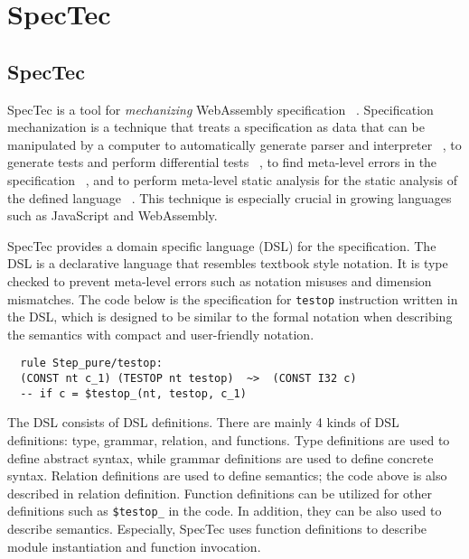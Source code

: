 
\chapter{SpecTec}
\label{ch:spectec}
\noindent



\newcommand{\seq}[1]{#1^*}







\section{SpecTec}
\label{sec:spectec}


SpecTec is a tool for \textit{mechanizing} WebAssembly specification
~\cite{spectec}.
Specification mechanization is a technique that treats a specification as data
that can be manipulated by a computer to automatically generate parser and
interpreter ~\cite{jiset}, to generate tests and perform differential tests
~\cite{jest}, to find meta-level errors in the specification ~\cite{jstar}, and
to perform meta-level static analysis for the static analysis of the defined
language ~\cite{jsaver}.
This technique is especially crucial in growing languages such as JavaScript
and WebAssembly.


SpecTec provides a domain specific language (DSL) for the specification.
The DSL is a declarative language that resembles textbook style notation.
It is type checked to prevent meta-level errors such as notation misuses and
dimension mismatches. The code below is the specification for \texttt{testop}
instruction written in the DSL, which is designed to be similar to the formal
notation when describing the semantics with compact and user-friendly
notation.
\\
\begin{verbatim}
  rule Step_pure/testop:
  (CONST nt c_1) (TESTOP nt testop)  ~>  (CONST I32 c)
  -- if c = $testop_(nt, testop, c_1)
\end{verbatim}


The DSL consists of DSL definitions.
There are mainly 4 kinds of DSL definitions: type, grammar, relation, and
functions.
Type definitions are used to define abstract syntax, while grammar definitions
are used to define concrete syntax.
Relation definitions are used to define semantics; the code above is also
described in relation definition.
Function definitions can be utilized for other definitions such as
\texttt{\$testop\_} in the code.
In addition, they can be also used to describe semantics.
Especially, SpecTec uses function definitions to describe module instantiation
and function invocation.


